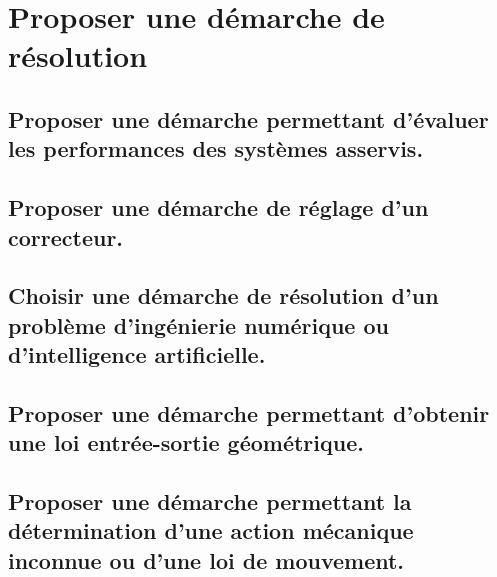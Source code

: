 \documentclass[10pt,fleqn]{book}
\newcommand{\repRel}{../..}
\newcommand{\repStyle}{\repRel/Style}
\newcommand{\td}{fichier_td}
\newcommand{\repExos}{\repRel/ExercicesCompetences}
\newcommand{\repExo}{dossier}
\begin{document}
\section{Proposer une démarche de résolution} 

\subsection{Proposer une démarche permettant d'évaluer les performances des systèmes asservis.} 

\begin{multicols}{2} 

\end{multicols}

\subsection{Proposer une démarche de réglage d'un correcteur.} 

\begin{multicols}{2} 

\renewcommand{\repExo}{\repExos/C1_ProposerDemarche/C1_02_ProposerDemarcheReglageCorrecteur/50_BancBalafre}
\renewcommand{\td}{50_BancBalafre}
\graphicspath{{\repStyle/png/}{\repExo/images/}}


\end{multicols}

\subsection{Choisir une démarche de résolution d’un problème d'ingénierie numérique ou d'intelligence artificielle. } 

\begin{multicols}{2} 

\end{multicols}

\subsection{Proposer une démarche permettant d'obtenir une loi entrée-sortie géométrique. } 

\begin{multicols}{2} 

\end{multicols}

\subsection{Proposer une démarche permettant la détermination d’une action mécanique inconnue ou d'une loi de mouvement.} 
\end{document}
